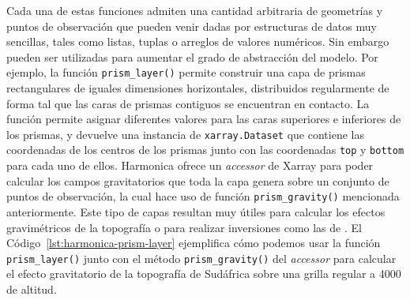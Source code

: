 Cada una de estas funciones admiten una cantidad arbitraria de geometrías
y puntos de observación que pueden venir dadas por estructuras de datos muy
sencillas, tales como listas, tuplas o arreglos de valores numéricos.
Sin embargo pueden ser utilizadas para aumentar el grado de abstracción del
modelo.
Por ejemplo, la función \texttt{prism\_layer()} permite construir una capa de
prismas rectangulares de iguales dimensiones horizontales, distribuidos
regularmente de forma tal que las caras de prismas contiguos se encuentran en
contacto.
La función permite asignar diferentes valores para las caras superiores
e inferiores de los prismas, y devuelve una instancia de
\texttt{xarray.Dataset} que contiene las coordenadas de los centros de los
prismas junto con las coordenadas \texttt{top} y \texttt{bottom} para cada uno
de ellos.
Harmonica ofrece un \emph{accessor} de Xarray para poder calcular los campos
gravitatorios que toda la capa genera sobre un conjunto de puntos de
observación, la cual hace uso de función \texttt{prism\_gravity()} mencionada
anteriormente.
Este tipo de capas resultan muy útiles para calcular los efectos gravimétricos
de la topografía o para realizar inversiones como las de \citet{uieda2017}.
El Código~\ref{lst:harmonica-prism-layer} ejemplifica cómo podemos usar la
función \texttt{prism\_layer()} junto con el método \texttt{prism\_gravity()}
del \emph{accessor} para calcular el efecto gravitatorio de la topografía de
Sudáfrica sobre una grilla regular a 4000\m{} de altitud.



